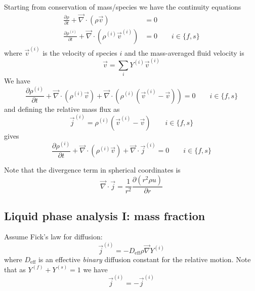 \documentclass[11pt,twoside]{report}
\begin{document}
Starting from conservation of mass/species we have the continuity equations
\begin{subequations}
\begin{align}
  \label{eq:total-continuity}
  \frac{\partial \rho}{\partial t} +
  \vec{\nabla} \cdot (\rho \vec{v}) &= 0 \\
  \label{eq:species-continuity}
  \frac{\partial \rho^{(i)}}{\partial t} +
  \vec{\nabla} \cdot (\rho^{(i)} \vec{v}^{(i)}) &= 0
  \qquad i \in \{f,s\}
\end{align}
\end{subequations}
where $\vec{v}^{(i)}$ is the velocity of species $i$ and the mass-averaged fluid velocity is
\begin{equation}
  \vec{v} = \sum_i Y^{(i)} \vec{v}^{(i)}
\end{equation}
We have
\begin{equation*}
  \frac{\partial \rho^{(i)}}{\partial t} +
  \vec{\nabla} \cdot (\rho^{(i)} \vec{v}) +
  \vec{\nabla} \cdot (\rho^{(i)} (\vec{v}^{(i)} - \vec{v})) = 0
  \qquad i \in \{f,s\}
\end{equation*}
and defining the relative mass flux as
\begin{equation}\label{eq:relative-mass-flux}
  \vec{j}^{(i)} = \rho^{(i)} (\vec{v}^{(i)} - \vec{v})
  \qquad i \in \{f,s\}
\end{equation}
gives
\begin{equation}\label{eq:species-continuity-relative}
  \frac{\partial \rho^{(i)}}{\partial t} +
  \vec{\nabla} \cdot (\rho^{(i)} \vec{v}) +
  \vec{\nabla} \cdot \vec{j}^{(i)} = 0
  \qquad i \in \{f,s\}
\end{equation}

Note that the divergence term in spherical coordinates is
\begin{equation*}
  \vec{\nabla} \cdot \vec{j} =
  \frac{1}{r^2} \frac{\partial (r^2 \rho u)}{\partial r}
\end{equation*}

\subsection{Liquid phase analysis I: mass fraction}

Assume Fick's law for diffusion:
\begin{equation}\label{eq:ficks-law}
  \vec{j}^{(i)} = -D_{\textrm{eff}} \rho \vec{\nabla} Y^{(i)}
\end{equation}
where $D_{\textrm{eff}}$ is an effective \emph{binary} diffusion constant for the relative motion.
Note that as $Y^{(f)} + Y^{(s)} = 1$ we have
\begin{equation*}
  \vec{j}^{(i)} = -\vec{j}^{(i)}
\end{equation*}
\end{document}
